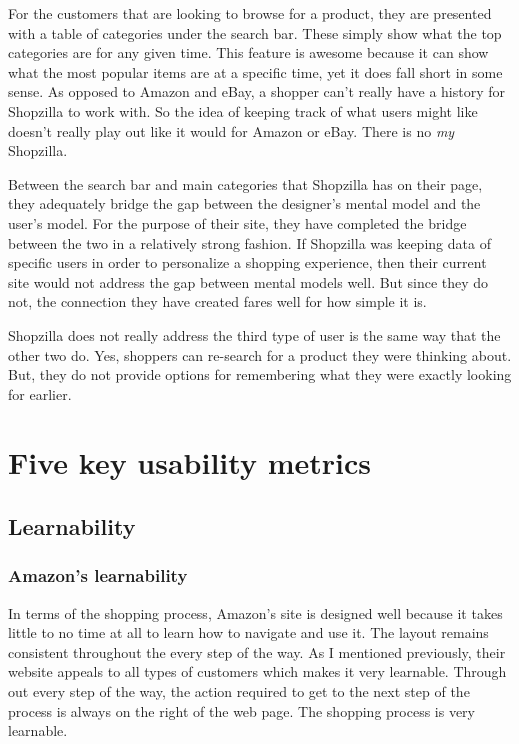 \documentclass[11pt, oneside]{article}
\begin{document}
	For the customers that are looking to browse for a product, they are presented with a table of categories under the search bar. These simply show what the top categories are for any given time. This feature is awesome because it can show what the most popular items are at a specific time, yet it does fall short in some sense. As opposed to Amazon and eBay, a shopper can't really have a history for Shopzilla to work with. So the idea of keeping track of what users might like doesn't really play out like it would for Amazon or eBay. There is no \textit{my} Shopzilla.

	Between the search bar and main categories that Shopzilla has on their page, they adequately bridge the gap between the designer's mental model and the user's model. For the purpose of their site, they have completed the bridge between the two in a relatively strong fashion. If Shopzilla was keeping data of specific users in order to personalize a shopping experience, then their current site would not address the gap between mental models well. But since they do not, the connection they have created fares well for how simple it is.

	Shopzilla does not really address the third type of user is the same way that the other two do. Yes, shoppers can re-search for a product they were thinking about. But, they do not provide options for remembering what they were exactly looking for earlier.

\section{Five key usability metrics}

	\subsection{Learnability}

		\subsubsection{Amazon's learnability}
		In terms of the shopping process, Amazon's site is designed well because it takes little to no time at all to learn how to navigate and use it. The layout remains consistent throughout the every step of the way. As I mentioned previously, their website appeals to all types of customers which makes it very learnable. Through out every step of the way, the action required to get to the next step of the process is always on the right of the web page. The shopping process is very learnable.
\end{document}
